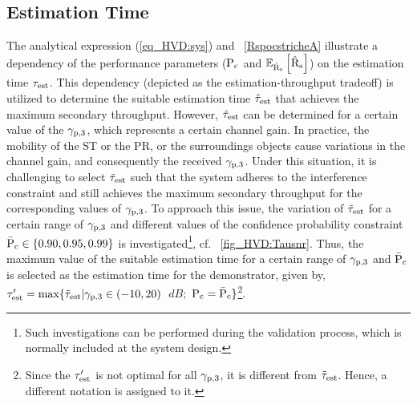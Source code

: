 \subsection{Estimation Time}
\label{esttime}
The analytical expression (\ref{eq_HVD:sys}) and \figurename~\ref{RspocstricheA} illustrate a dependency of the performance parameters ($\text{P}_{\text{c}}$ and ${\mathbb E}_{\hat{\text{{R}}}_{\text{s}}}\left[ \hat{\text{{R}}}_{\text{s}} \right]$) on the estimation time $\tau_{\text{est}}$. This dependency (depicted as the estimation-throughput tradeoff) is utilized to determine the suitable estimation time $\tilde{\tau}_{\text{est}}$ that achieves the maximum secondary throughput. However, $\tilde{\tau}_{\text{est}}$ can be determined for a certain value of the ${\gamma}_{\text{p,3}}$, which represents a certain channel gain. In practice, the mobility of the ST or the PR, or the surroundings objects cause variations in the channel gain, and consequently the received ${\gamma}_{\text{p,3}}$. Under this situation, it is challenging to select $\tilde{\tau}_{\text{est}}$ such that the system adheres to the interference constraint and still achieves the maximum secondary throughput for the corresponding values of ${\gamma}_{\text{p,3}}$. To approach this issue, the variation of $\tilde{\tau}_{\text{est}}$ for a certain range of ${\gamma}_{\text{p,3}}$ and different values of the confidence probability constraint $\bar{\text{P}}_{\text{c}} \in \{0.90, 0.95, 0.99\}$ is investigated\footnote{Such investigations can be performed during the validation process, which is normally included at the system design.}, cf. \figurename~\ref{fig_HVD:Tausnr}. %
Thus, the maximum value of the suitable estimation time for a certain range of ${\gamma}_{\text{p,3}}$ and $\bar{\text{P}}_{\text{c}}$ is selected as the estimation time for the demonstrator, given by, ${\tau}\sp{\prime}_{\text{est}} = \operatorname*{max}\{ \tilde{\tau}_{\text{est}} | {\gamma}_{\text{p,3}} \in (-10,20)$ $\SI{}{dB};$ $\text{P}_{\text{c}} = \bar{\text{P}}_{\text{c}} \}$\footnote{Since the ${\tau}\sp{\prime}_{\text{est}}$ is not optimal for all ${\gamma}_{\text{p,3}}$, it is different from $\tilde{\tau}_{\text{est}}$. Hence, a different notation is assigned to it.}.  
